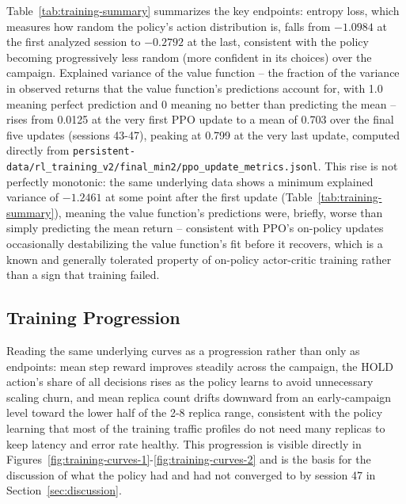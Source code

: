 Table~\ref{tab:training-summary} summarizes the key endpoints: entropy
loss, which measures how random the policy's action distribution is, falls
from $-1.0984$ at the first analyzed session to $-0.2792$ at the last,
consistent with the policy becoming progressively less random (more
confident in its choices) over the campaign. Explained variance of the
value function -- the fraction of the variance in observed returns that
the value function's predictions account for, with 1.0 meaning perfect
prediction and 0 meaning no better than predicting the mean -- rises from
0.0125 at the very first PPO update to a mean of 0.703 over the final five
updates (sessions 43-47), peaking at 0.799 at the very last update,
computed directly from
\texttt{persistent-data/\allowbreak \allowbreak rl\_\allowbreak training\_\allowbreak v2/\allowbreak \allowbreak final\_\allowbreak min2/\allowbreak \allowbreak ppo\_\allowbreak update\_\allowbreak metrics.jsonl}.
This rise is not perfectly monotonic: the same underlying data shows a
minimum explained variance of $-1.2461$ at some point after the first
update (Table~\ref{tab:training-summary}), meaning the value function's
predictions were, briefly, worse than simply predicting the mean return --
consistent with PPO's on-policy updates occasionally destabilizing the
value function's fit before it recovers, which is a known and generally
tolerated property of on-policy actor-critic training rather than a sign
that training failed.

\begin{table}[H]
\centering
\caption[Training summary]{Training summary: key endpoints across 48 analyzed sessions.}
\label{tab:training-summary}

\end{table}

\subsection{Training Progression}

Reading the same underlying curves as a progression rather than only as
endpoints: mean step reward improves steadily across the campaign, the
HOLD action's share of all decisions rises as the policy learns to avoid
unnecessary scaling churn, and mean replica count drifts downward from an
early-campaign level toward the lower half of the 2-8 replica range,
consistent with the policy learning that most of the training traffic
profiles do not need many replicas to keep latency and error rate healthy.
This progression is visible directly in
Figures~\ref{fig:training-curves-1}-\ref{fig:training-curves-2} and is the
basis for the discussion of what the policy had and had not converged to
by session 47 in Section~\ref{sec:discussion}.

